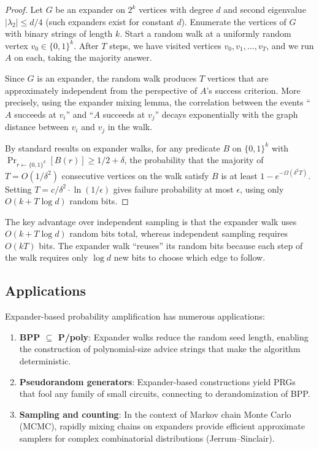 \documentclass[twoside,12pt]{book}
\theoremstyle{plain}
\theoremstyle{definition}
\theoremstyle{remark}
\begin{document}
\begin{proof}
Let $G$ be an expander on $2^k$ vertices with degree $d$ and second
eigenvalue $|\lambda_2| \leq d/4$ (such expanders exist for constant
$d$). Enumerate the vertices of $G$ with binary strings of length $k$.
Start a random walk at a uniformly random vertex $v_0 \in \{0,1\}^k$.
After $T$ steps, we have visited vertices $v_0, v_1, \ldots, v_T$, and we
run $A$ on each, taking the majority answer.

Since $G$ is an expander, the random walk produces $T$ vertices that are
approximately independent from the perspective of $A$'s success
criterion. More precisely, using the expander mixing lemma, the
correlation between the events ``$A$ succeeds at $v_i$'' and ``$A$
succeeds at $v_j$'' decays exponentially with the graph distance between
$v_i$ and $v_j$ in the walk.

By standard results on expander walks, for any predicate $B$ on
$\{0,1\}^k$ with $\Pr_{r \leftarrow \{0,1\}^k}[B(r)] \geq 1/2 + \delta$,
the probability that the majority of $T = O(1/\delta^2)$ consecutive
vertices on the walk satisfy $B$ is at least $1 - e^{-\Omega(\delta^2
T)}$. Setting $T = c/\delta^2 \cdot \ln(1/\epsilon)$ gives failure
probability at most $\epsilon$, using only $O(k + T \log d)$ random bits.
\end{proof}

The key advantage over independent sampling is that the expander walk
uses $O(k + T \log d)$ random bits total, whereas independent sampling
requires $O(kT)$ bits. The expander walk ``reuses'' its random bits
because each step of the walk requires only $\log d$ new bits to choose
which edge to follow.

\subsection{Applications}

Expander-based probability amplification has numerous applications:

\begin{enumerate}[label=(\roman*)]
\item \textbf{BPP $\subseteq$ P/poly}: Expander walks reduce the random
    seed length, enabling the construction of polynomial-size
    advice strings that make the algorithm deterministic.

\item \textbf{Pseudorandom generators}: Expander-based constructions
    yield PRGs that fool any family of small circuits, connecting
    to derandomization of BPP.

\item \textbf{Sampling and counting}: In the context of Markov chain
    Monte Carlo (MCMC), rapidly mixing chains on expanders provide
    efficient approximate samplers for complex combinatorial
    distributions (Jerrum--Sinclair).
\end{enumerate}
\end{document}
